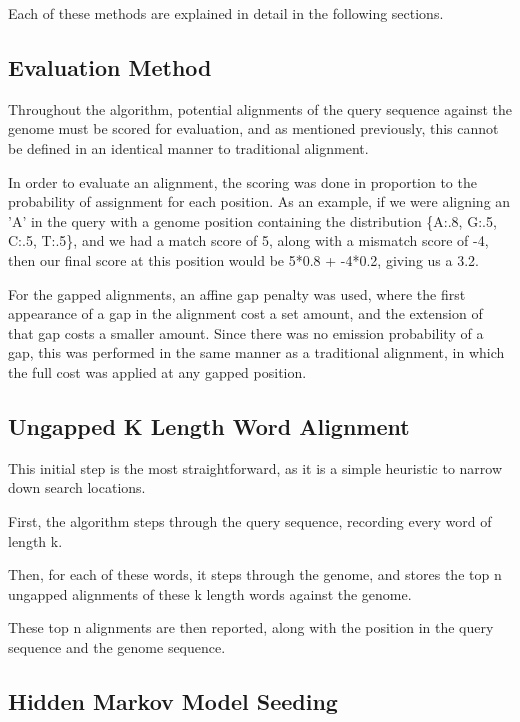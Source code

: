 \documentclass[12pt, conference]{IEEEtran}
\begin{document}
	Each of these methods are explained in detail in the following sections.

	\subsection{\textbf{Evaluation Method}}
	
	Throughout the algorithm, potential alignments of the query sequence against the genome must be scored for evaluation, and as mentioned previously, this cannot be defined in an identical manner to traditional alignment.
	
	In order to evaluate an alignment, the scoring was done in proportion to the probability of assignment for each position. As an example, if we were aligning an 'A' in the query with a genome position containing the distribution \{A:.8, G:.5, C:.5, T:.5\}, and we had a match score of 5, along with a mismatch score of -4, then our final score at this position would be 5*0.8 + -4*0.2, giving us a 3.2.
	
	For the gapped alignments, an affine gap penalty was used, where the first appearance of a gap in the alignment cost a set amount, and the extension of that gap costs a smaller amount. Since there was no emission probability of a gap, this was performed in the same manner as a traditional alignment, in which the full cost was applied at any gapped position.

	\subsection{\textbf{Ungapped K Length Word Alignment}}
	
	This initial step is the most straightforward, as it is a simple heuristic to narrow down search locations.
	
	First, the algorithm steps through the query sequence, recording every word of length k.
	
	Then, for each of these words, it steps through the genome, and stores the top n ungapped alignments of these k length words against the genome.
	
	These top n alignments are then reported, along with the position in the query sequence and the genome sequence.

	\subsection{\textbf{Hidden Markov Model Seeding}}
	
\end{document}
